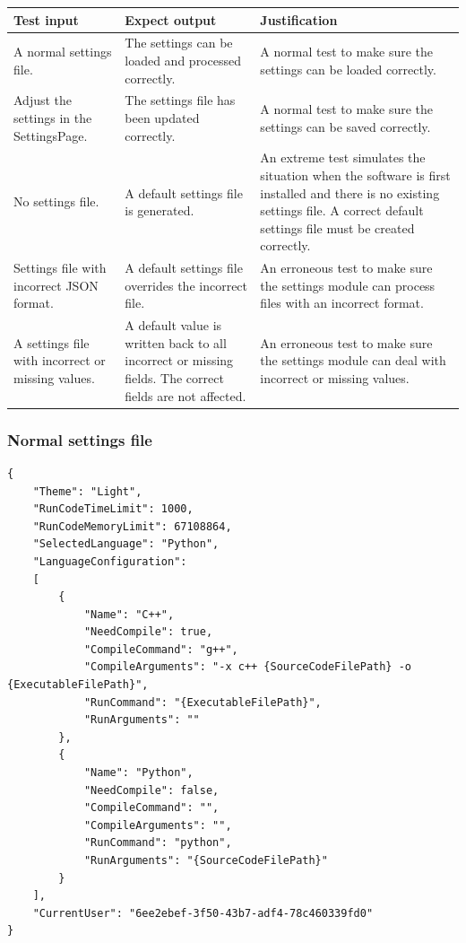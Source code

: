 \documentclass[a4paper]{report}
\begin{document}
\begin{tabulary}{\textwidth}{|L|L|L|}
    \hline
    Test input & Expect output & Justification \\
    \hline
    A normal settings file. & The settings can be loaded and processed correctly. & A normal test to make sure the settings can be loaded correctly. \\ 
    \hline
    Adjust the settings in the SettingsPage. & The settings file has been updated correctly. & A normal test to make sure the settings can be saved correctly. \\
    \hline
    No settings file. & A default settings file is generated. & An extreme test simulates the situation when the software is first installed and there is no existing settings file. A correct default settings file must be created correctly. \\
    \hline
    Settings file with incorrect JSON format. & A default settings file overrides the incorrect file. & An erroneous test to make sure the settings module can process files with an incorrect format. \\
    \hline
    A settings file with incorrect or missing values. & A default value is written back to all incorrect or missing fields. The correct fields are not affected. & An erroneous test to make sure the settings module can deal with incorrect or missing values. \\
    \hline
\end{tabulary}

\subsubsection{Normal settings file}

\begin{verbatim}
{
    "Theme": "Light",
    "RunCodeTimeLimit": 1000,
    "RunCodeMemoryLimit": 67108864,
    "SelectedLanguage": "Python",
    "LanguageConfiguration": 
    [
        {
            "Name": "C++",
            "NeedCompile": true,
            "CompileCommand": "g++",
            "CompileArguments": "-x c++ {SourceCodeFilePath} -o {ExecutableFilePath}",
            "RunCommand": "{ExecutableFilePath}",
            "RunArguments": ""
        },
        {
            "Name": "Python",
            "NeedCompile": false,
            "CompileCommand": "",
            "CompileArguments": "",
            "RunCommand": "python",
            "RunArguments": "{SourceCodeFilePath}"
        }
    ],
    "CurrentUser": "6ee2ebef-3f50-43b7-adf4-78c460339fd0"
}
\end{verbatim}
\end{document}
